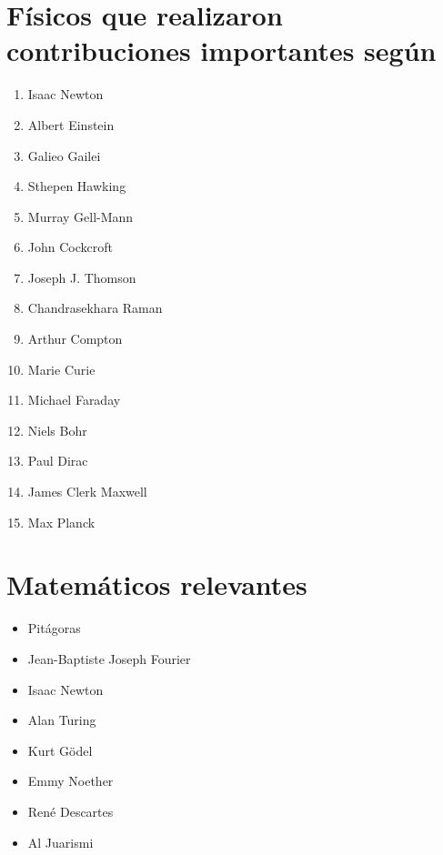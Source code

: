 \documentclass[10pt,a4paper]{article}
\begin{document}

\section*{Físicos que realizaron contribuciones importantes según \cite{physics}}

\begin{enumerate}
	\item Isaac Newton
	\item Albert Einstein
	\item Galieo Gailei
	\item Sthepen Hawking
	\item Murray Gell-Mann
	\item John Cockcroft
	\item Joseph J. Thomson
	\item Chandrasekhara Raman
	\item Arthur Compton
	\item Marie Curie
	\item Michael Faraday
	\item Niels Bohr
	\item Paul Dirac
	\item James Clerk Maxwell
	\item Max Planck
\end{enumerate}


\section*{Matemáticos relevantes \cite{math}}

\begin{itemize}
	\item Pitágoras
	\item Jean-Baptiste Joseph Fourier
	\item Isaac Newton
	\item Alan Turing
	\item Kurt Gödel
	\item Emmy Noether
	\item René Descartes
	\item Al Juarismi
\end{itemize}

\end{document}
